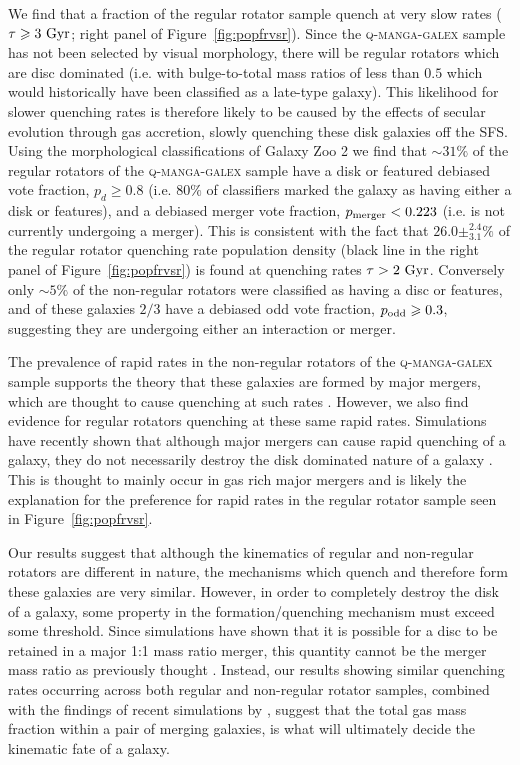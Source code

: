 \documentclass[useAMS,usenatbib]{mn2e}
\begin{document}
We find that a fraction of the regular rotator sample quench at very slow rates ($\tau \geq 3~\rm{Gyr}$; right panel of Figure~\ref{fig:popfrvsr}). Since the \textsc{q-manga-galex} sample has not been selected by visual morphology, there will be regular rotators which are disc dominated (i.e. with bulge-to-total mass ratios of less than $0.5$ which would historically have been classified as a late-type galaxy). This likelihood for slower quenching rates is therefore likely to be caused by the effects of secular evolution through gas accretion, slowly quenching these disk galaxies off the SFS. Using the morphological classifications of Galaxy Zoo 2 \citep{lintott11, GZ2} we find that $\sim 31\%$ of the regular rotators of the \textsc{q-manga-galex} sample have a disk or featured debiased vote fraction, $p_d \geq 0.8$ (i.e. $80\%$ of classifiers marked the galaxy as having either a disk or features), and a debiased merger vote fraction, $p_{\rm{merger}} < 0.223$ (i.e. is not currently undergoing a merger). This is consistent with the fact that $26.0\pm^{2.4}_{3.1}\%$ of the regular rotator quenching rate population density (black line in the right panel of Figure~\ref{fig:popfrvsr}) is found at quenching rates $\tau > 2~\rm{Gyr}$. Conversely only $\sim5\%$ of the non-regular rotators were classified as having a disc or features, and of these galaxies $2/3$ have a debiased odd vote fraction, $p_{\rm{odd}} \geq 0.3$, suggesting they are undergoing either an interaction or merger. 

The prevalence of rapid rates in the non-regular rotators of the \textsc{q-manga-galex} sample supports the theory that these galaxies are formed by major mergers, which are thought to cause quenching at such rates \citep{springel05b, bell06, lotz08b,lotz11,smethurst15}. However, we also find evidence for regular rotators quenching at these same rapid rates. Simulations have recently shown that although major mergers can cause rapid quenching of a galaxy, they do not necessarily destroy the disk dominated nature of a galaxy \citep{pontzen16, sparre16}. This is thought to mainly occur in gas rich major mergers and is likely the explanation for the preference for rapid rates in the regular rotator sample seen in Figure~\ref{fig:popfrvsr}.

Our results suggest that although the kinematics of regular and non-regular rotators are different in nature, the mechanisms which quench and therefore form these galaxies are very similar. However, in order to completely destroy the disk of a galaxy, some property in the formation/quenching mechanism must exceed some threshold. Since simulations have shown that it is possible for a disc to be retained in a major 1:1 mass ratio merger, this quantity cannot be the merger mass ratio as previously thought \citep{binneytremaine, bois10, tonini16}. Instead, our results showing similar quenching rates occurring across both regular and non-regular rotator samples, combined with the findings of recent simulations by \cite{pontzen16, sparre16}, suggest that the total gas mass fraction within a pair of merging galaxies, is what will ultimately decide the kinematic fate of a galaxy. 
\end{document}
